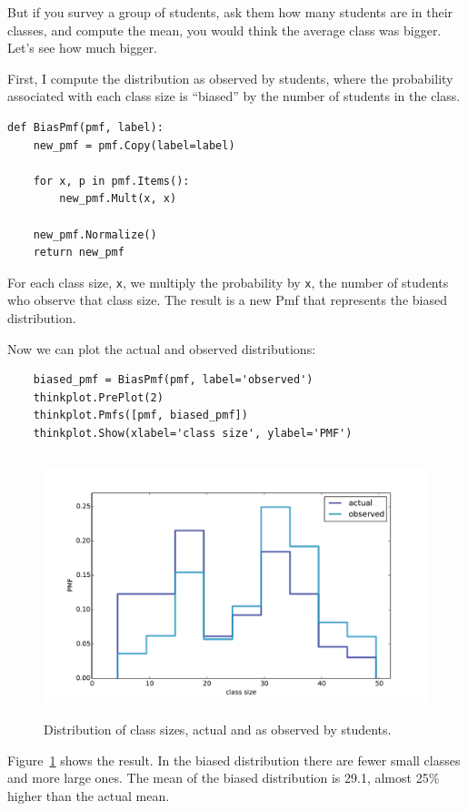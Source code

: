 \documentclass[12pt]{book}
\begin{document}
But if you survey a group of students, ask them how many
students are in their classes, and compute the mean, you would
think the average class was bigger.  Let's see how
much bigger.

First, I compute the
distribution as observed by students, where the probability
associated with each class size is ``biased'' by the number
of students in the class.

\begin{verbatim}
def BiasPmf(pmf, label):
    new_pmf = pmf.Copy(label=label)

    for x, p in pmf.Items():
        new_pmf.Mult(x, x)
        
    new_pmf.Normalize()
    return new_pmf
\end{verbatim}

For each class size, {\tt x}, we multiply the probability by
{\tt x}, the number of students who observe that class size.
The result is a new Pmf that represents the biased distribution.

Now we can plot the actual and observed distributions:

\begin{verbatim}
    biased_pmf = BiasPmf(pmf, label='observed')
    thinkplot.PrePlot(2)
    thinkplot.Pmfs([pmf, biased_pmf])
    thinkplot.Show(xlabel='class size', ylabel='PMF')
\end{verbatim}

\begin{figure}
\centerline{\includegraphics[height=3.0in]{figs/class_size1.pdf}}
\caption{Distribution of class sizes, actual and as observed by students.}
\label{class_size1}
\end{figure}

Figure~\ref{class_size1} shows the result.  In the biased distribution
there are fewer small classes and more large ones.
The mean of the biased distribution is 29.1, almost 25\% higher
than the actual mean.
\end{document}
